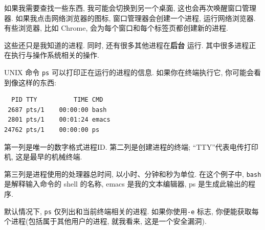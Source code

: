 \documentclass[12pt]{book}
\begin{document}
{%
如果我需要查找一些东西, 我可能会切换到另一个桌面,
这也会再次唤醒窗口管理器.
如果我点击网络浏览器的图标, 窗口管理器会创建一个进程, 运行网络浏览器.
有些浏览器, 比如 Chrome, 会为每个窗口和每个标签页都创建新的进程.

这些还只是我知道的进程.
同时, 还有很多其他进程在{\bf 后台} 运行.
其中很多进程正在执行与操作系统相关的操作.

UNIX 命令 {\tt ps} 可以打印正在运行的进程的信息.
如果你在终端执行它, 你可能会看到像这样的东西:

\begin{verbatim}
  PID TTY          TIME CMD
 2687 pts/1    00:00:00 bash
 2801 pts/1    00:01:24 emacs
24762 pts/1    00:00:00 ps
\end{verbatim}
%

第一列是唯一的数字格式进程ID.
第二列是创建进程的终端; 
``TTY''代表电传打印机, 这是最早的机械终端.

第三列是进程使用的处理器总时间, 以小时、分钟和秒为单位.
在这个例子中, {\tt bash} 是解释输入命令的 shell 的名称,
emacs 是我的文本编辑器, ps 是生成此输出的程序.

%
默认情况下, {\tt ps} 仅列出和当前终端相关的进程.
如果你使用{\tt -e} 标志, 你便能获取每个进程(包括属于其他用户的进程,
就我看来, 这是一个安全漏洞).

}
\end{document}

